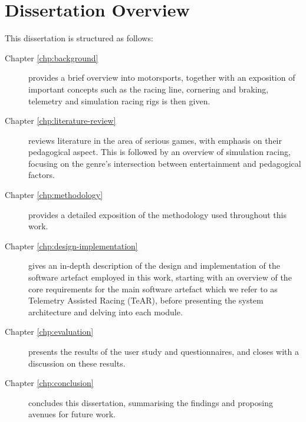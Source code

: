 \section{Dissertation Overview}
This dissertation is structured as follows:
\begin{description}
	\item [Chapter \ref{chp:background}] provides a brief overview into motorsports, together with an exposition of important concepts such as the racing line, cornering and braking, telemetry and simulation racing rigs is then given.
	\item [Chapter \ref{chp:literature-review}] reviews literature in the area of serious games, with emphasis on their pedagogical aspect. This is followed by an overview of simulation racing, focusing on the genre's intersection between entertainment and pedagogical factors.
	\item [Chapter \ref{chp:methodology}] provides a detailed exposition of the methodology used throughout this work. 
	\item [Chapter \ref{chp:design-implementation}] gives an in-depth description of the design and implementation of the software artefact employed in this work, starting with an overview of the core requirements for the main software artefact which we refer to as Telemetry Assisted Racing (TeAR), before presenting the system architecture and delving into each module. 
	\item [Chapter \ref{chp:evaluation}] presents the results of the user study and questionnaires, and closes with a discussion on these results.
	\item [Chapter \ref{chp:conclusion}] concludes this dissertation, summarising the findings and proposing avenues for future work.
\end{description}